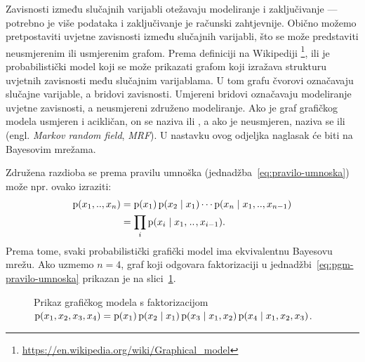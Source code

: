 \documentclass[utf8, diplomski, lmodern]{fer}
\begin{document}
Zavisnosti između slučajnih varijabli otežavaju modeliranje i zaključivanje --- potrebno je više podataka i zaključivanje je računski zahtjevnije. Obično možemo pretpostaviti uvjetne zavisnosti između slučajnih varijabli, što se može predstaviti neusmjerenim ili usmjerenim grafom. Prema definiciji na Wikipediji \footnote{\url{https://en.wikipedia.org/wiki/Graphical_model}},  ili  je probabilistički model koji se može prikazati grafom koji izražava strukturu uvjetnih zavisnosti među slučajnim varijablama. U tom grafu čvorovi označavaju slučajne varijable, a bridovi zavisnosti. Umjereni bridovi označavaju modeliranje uvjetne zavisnosti, a neusmjereni združeno modeliranje. Ako je graf grafičkog modela usmjeren i acikličan, on se naziva  ili , a ako je neusmjeren, naziva se  ili  (engl. \textit{Markov random field}, \textit{MRF}). U nastavku ovog odjeljka naglasak će biti na Bayesovim mrežama.

Združena razdioba se prema pravilu umnoška (jednadžba~\eqref{eq:pravilo-umnoska}) može npr. ovako izraziti:
\begin{align}
\operatorname*{\mathrm{p}}(x_1,..,x_n) 
&= \operatorname*{\mathrm{p}}(x_1)\operatorname*{\mathrm{p}}(x_2\mid x_1)\cdots\operatorname*{\mathrm{p}}(x_n\mid x_1,..,x_{n-1}) \\
&= \prod_i\operatorname*{\mathrm{p}}(x_i\mid x_1,\mkern1.5mu{..}\mkern1.5mu,x_{i-1}) \text{.}
\label{eq:pgm-pravilo-umnoska}
\end{align} 
Prema tome, svaki probabilistički grafički model ima ekvivalentnu Bayesovu mrežu. Ako uzmemo $n=4$, graf koji odgovara faktorizaciji u jednadžbi~\eqref{eq:pgm-pravilo-umnoska} prikazan je na slici~\ref{fig:bayesova-mreza}.

\begin{figure}
	\centering
	\caption{Prikaz grafičkog modela s faktorizacijom $\operatorname*{\mathrm{p}}(x_1,x_2,x_3,x_4)=\operatorname*{\mathrm{p}}(x_1)\operatorname*{\mathrm{p}}(x_2\mid x_1)\operatorname*{\mathrm{p}}(x_3\mid x_1,x_2)\operatorname*{\mathrm{p}}(x_4\mid x_1,x_2,x_3)$.}
	\label{fig:bayesova-mreza}
\end{figure}
\end{document}
